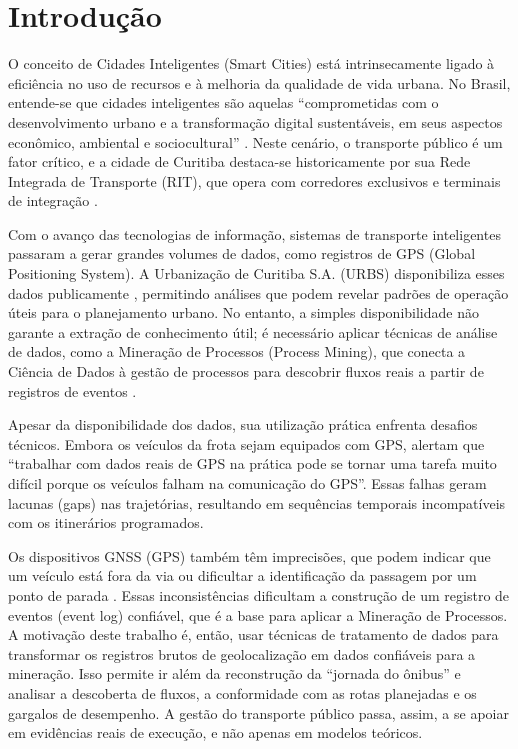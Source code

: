 
\chapter{Introdução}\label{cap:introducao}

O conceito de Cidades Inteligentes (Smart Cities) está intrinsecamente ligado à eficiência no uso de recursos e à melhoria da qualidade de vida urbana. No Brasil, entende-se que cidades inteligentes são aquelas ``comprometidas com o desenvolvimento urbano e a transformação digital sustentáveis, em seus aspectos econômico, ambiental e sociocultural'' \cite[p. 16]{pinho2022}. Neste cenário, o transporte público é um fator crítico, e a cidade de Curitiba destaca-se historicamente por sua Rede Integrada de Transporte (RIT), que opera com corredores exclusivos e terminais de integração \cite{kozievitch2016}.

Com o avanço das tecnologias de informação, sistemas de transporte inteligentes passaram a gerar grandes volumes de dados, como registros de GPS (Global Positioning System). A Urbanização de Curitiba S.A. (URBS) disponibiliza esses dados publicamente \cite{urbs2024}, permitindo análises que podem revelar padrões de operação úteis para o planejamento urbano. No entanto, a simples disponibilidade não garante a extração de conhecimento útil; é necessário aplicar técnicas de análise de dados, como a Mineração de Processos (Process Mining), que conecta a Ciência de Dados à gestão de processos para descobrir fluxos reais a partir de registros de eventos \cite{aalst2016}.

Apesar da disponibilidade dos dados, sua utilização prática enfrenta desafios técnicos. Embora os veículos da frota sejam equipados com GPS,  alertam que ``trabalhar com dados reais de GPS na prática pode se tornar uma tarefa muito difícil porque os veículos falham na comunicação do GPS''. Essas falhas geram lacunas (gaps) nas trajetórias, resultando em sequências temporais incompatíveis com os itinerários programados.

Os dispositivos GNSS (GPS) também têm imprecisões, que podem indicar que um veículo está fora da via ou dificultar a identificação da passagem por um ponto de parada \cite{martins2022}. Essas inconsistências dificultam a construção de um registro de eventos (event log) confiável, que é a base para aplicar a Mineração de Processos. A motivação deste trabalho é, então, usar técnicas de tratamento de dados para transformar os registros brutos de geolocalização em dados confiáveis para a mineração. Isso permite ir além da reconstrução da ``jornada do ônibus'' e analisar a descoberta de fluxos, a conformidade com as rotas planejadas e os gargalos de desempenho. A gestão do transporte público passa, assim, a se apoiar em evidências reais de execução, e não apenas em modelos teóricos.

